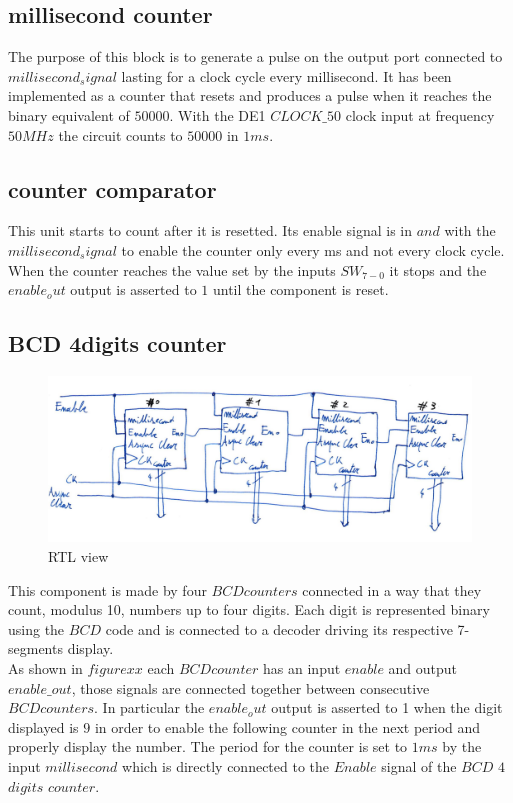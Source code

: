 \documentclass[12pt]{article}
\begin{document}
\subsection{millisecond counter}
The purpose of this block is to generate a pulse on the output port connected to $millisecond_signal$ lasting for a clock cycle every millisecond. It has been implemented as a counter that resets and produces a pulse when it reaches the binary equivalent of $50000$. With the DE1 $CLOCK\_50$ clock input at frequency $50MHz$ the circuit counts to $50000$ in $1ms$.
\subsection{counter comparator}
This unit starts to count after it is resetted. Its enable signal is in $and$ with the $millisecond_signal$ to enable the counter only every ms and not every clock cycle. \\When the counter reaches the value set by the inputs $SW_{7-0}$ it stops and the $enable_out$ output is asserted to $1$ until the component is reset.
\subsection{BCD 4digits counter}
\begin{figure}[h]
	\centering
	\includegraphics[scale = 0.6]{immagini/RTBCD.jpg}
	\caption{RTL view}
\end{figure}

This component is made by four $BCDcounters$ connected in a way that they count, modulus 10, numbers up to four digits. Each digit is represented binary using the $BCD$ code and is connected to a decoder driving its respective 7-segments display. \\
As shown in $figure xx$ each $BCDcounter$ has an input $enable$ and output $enable\_out$, those signals are connected together between consecutive $BCDcounters$. In particular the $enable_out$ output is asserted to 1 when the digit displayed is $9$ in order to enable the following counter in the next period and properly display the number. The period for the counter is set to $1ms$ by the input $millisecond$ which is directly connected to the $Enable$ signal of the  $BCD$ $4$ $digits$ $counter$.
\end{document}
